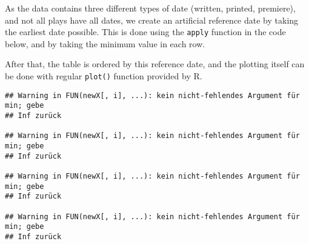 \documentclass[]{book}
\newenvironment{Shaded}{\begin{snugshade}}{\end{snugshade}}
\newcommand{\CommentTok}[1]{\textcolor[rgb]{0.56,0.35,0.01}{\textit{#1}}}
\newcommand{\DataTypeTok}[1]{\textcolor[rgb]{0.13,0.29,0.53}{#1}}
\newcommand{\DecValTok}[1]{\textcolor[rgb]{0.00,0.00,0.81}{#1}}
\newcommand{\KeywordTok}[1]{\textcolor[rgb]{0.13,0.29,0.53}{\textbf{#1}}}
\newcommand{\NormalTok}[1]{#1}
\newcommand{\OperatorTok}[1]{\textcolor[rgb]{0.81,0.36,0.00}{\textbf{#1}}}
\newcommand{\OtherTok}[1]{\textcolor[rgb]{0.56,0.35,0.01}{#1}}
\newcommand{\StringTok}[1]{\textcolor[rgb]{0.31,0.60,0.02}{#1}}
\begin{document}
As the data contains three different types of date (written, printed, premiere), and not all plays have all dates, we create an artificial reference date by taking the earliest date possible. This is done using the \texttt{apply} function in the code below, and by taking the minimum value in each row.

After that, the table is ordered by this reference date, and the plotting itself can be done with regular \texttt{plot()} function provided by R.

\begin{Shaded}
\end{Shaded}

\begin{verbatim}
## Warning in FUN(newX[, i], ...): kein nicht-fehlendes Argument für min; gebe
## Inf zurück

## Warning in FUN(newX[, i], ...): kein nicht-fehlendes Argument für min; gebe
## Inf zurück

## Warning in FUN(newX[, i], ...): kein nicht-fehlendes Argument für min; gebe
## Inf zurück

## Warning in FUN(newX[, i], ...): kein nicht-fehlendes Argument für min; gebe
## Inf zurück
\end{verbatim}
\end{document}
